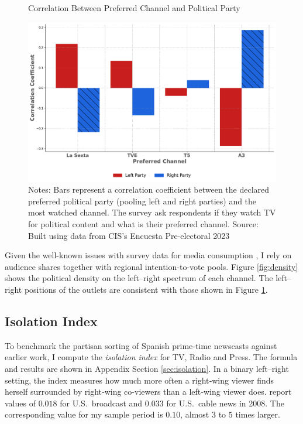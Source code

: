 \documentclass[12pt]{article}
\begin{document}
	
	\begin{figure}[h!]
		\centering
		\caption{Correlation Between Preferred Channel and Political Party}
		\includegraphics[width=120mm]{figures/corr_party_channel3}
		\caption*{\small Notes:  Bars represent a correlation coefficient between the declared preferred political party (pooling left and right parties) and the most watched channel. The survey ask respondents if they watch TV for political content and what is their preferred channel. Source: Built using data from CIS's Encuesta Pre-electoral 2023 }
		\label{fig:opinion}
	\end{figure}
	Given the well-known issues with survey data for media consumption \citep{prior}, I rely on audience shares together with regional intention-to-vote pools. Figure \ref{fig:density} shows the political density on the left–right spectrum of each channel. The left–right positions of the outlets are consistent with those shown in Figure \ref{fig:opinion}. 
	

	
	
	
	\subsection*{Isolation Index}
	
	To benchmark the partisan sorting of Spanish prime‐time newscasts against earlier work, I compute the \emph{isolation index}  for TV, Radio and Press.  The formula and results are shown in Appendix Section \ref{sec:isolation}. In a binary left–right setting, the index measures how much more often a right‐wing viewer finds herself surrounded by right‐wing co-viewers than a left‐wing viewer does.  \citet{gentzkow_isolation} report values of $0.018$ for U.S.\ broadcast and $0.033$ for U.S.\ cable news in 2008.  The corresponding value for my sample period is $0.10$, almost $3$ to $5$ times larger. 
\end{document}
